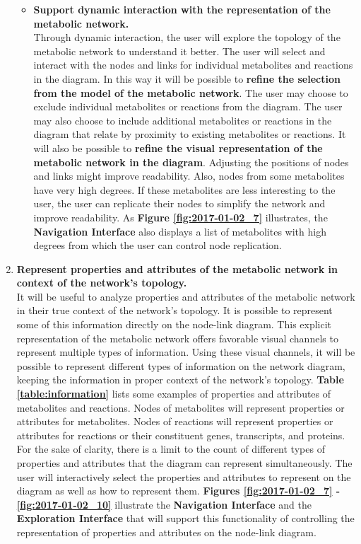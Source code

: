 \begin{enumerate}
\begin{itemize}
\item \textbf{Support dynamic interaction with the representation of the metabolic network.}
\\ Through dynamic interaction, the user will explore the topology of the metabolic network to understand it better.
The user will select and interact with the nodes and links for individual metabolites and reactions in the diagram.
In this way it will be possible to \textbf{refine the selection from the model of the metabolic network}.
The user may choose to exclude individual metabolites or reactions from the diagram.
The user may also choose to include additional metabolites or reactions in the diagram that relate by proximity to existing metabolites or reactions.
It will also be possible to \textbf{refine the visual representation of the metabolic network in the diagram}.
Adjusting the positions of nodes and links might improve readability.
Also, nodes from some metabolites have very high degrees.
If these metabolites are less interesting to the user, the user can replicate their nodes to simplify the network and improve readability.
As \textbf{Figure \ref{fig:2017-01-02_7}} illustrates, the \textbf{Navigation Interface} also displays a list of metabolites with high degrees from which the user can control node replication.

\end{itemize}

\item \textbf{Represent properties and attributes of the metabolic network in context of the network's topology.}
\\ It will be useful to analyze properties and attributes of the metabolic network in their true context of the network's topology.
It is possible to represent some of this information directly on the node-link diagram.
This explicit representation of the metabolic network offers favorable visual channels to represent multiple types of information.
Using these visual channels, it will be possible to represent different types of information on the network diagram, keeping the information in proper context of the network's topology.
\textbf{Table \ref{table:information}} lists some examples of properties and attributes of metabolites and reactions.
Nodes of metabolites will represent properties or attributes for metabolites.
Nodes of reactions will represent properties or attributes for reactions or their constituent genes, transcripts, and proteins.
For the sake of clarity, there is a limit to the count of different types of properties and attributes that the diagram can represent simultaneously.
The user will interactively select the properties and attributes to represent on the diagram as well as how to represent them.
\textbf{Figures \ref{fig:2017-01-02_7} - \ref{fig:2017-01-02_10}} illustrate the \textbf{Navigation Interface} and the \textbf{Exploration Interface} that will support this functionality of controlling the representation of properties and attributes on the node-link diagram.


\end{enumerate}
